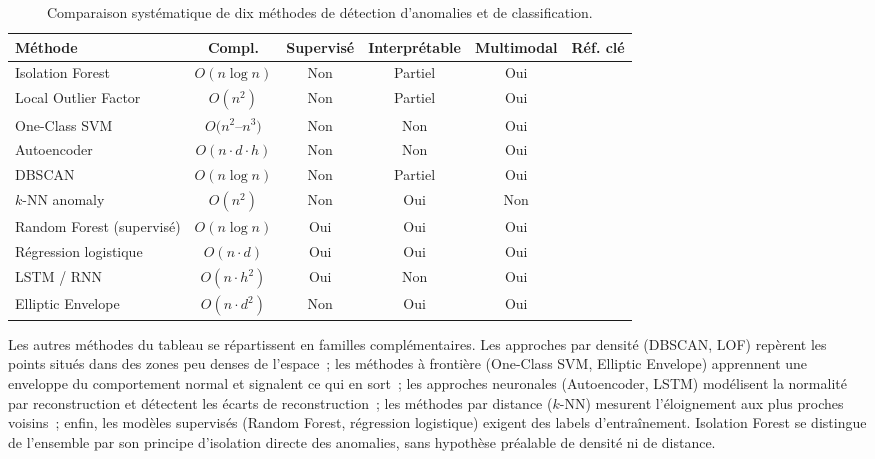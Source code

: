 \begin{table}[H]
    \centering
    \small
    \setlength{\tabcolsep}{2.5pt}
    \caption{Comparaison systématique de dix méthodes de détection d'anomalies et de
    classification.}
    \label{tab:comparaison_methodes_anomalies}
     \begin{tabular}{lccccl}
        \toprule
        \textbf{Méthode} & \textbf{Compl.} & \textbf{Supervisé} &
        \textbf{Interprétable} & \textbf{Multimodal} &
        \textbf{Réf. clé} \\
        \midrule
        Isolation Forest
        & $O(n \log n)$ & Non & Partiel & Oui
        & \cite{liu2008isolation} \\
        \addlinespace
        Local Outlier Factor
        & $O(n^2)$ & Non & Partiel & Oui
        & \cite{breunig2000lof} \\
        \addlinespace
        One-Class SVM
        & $O(n^2$--$n^3)$ & Non & Non & Oui
        & \cite{scholkopf2001estimating} \\
        \addlinespace
        Autoencoder
        & $O(n \cdot d \cdot h)$ & Non & Non & Oui
        & \cite{sakurada2014anomaly} \\
        \addlinespace
        DBSCAN
        & $O(n \log n)$ & Non & Partiel & Oui
        & \cite{ester1996density} \\
        \addlinespace
        $k$-NN anomaly
        & $O(n^2)$ & Non & Oui & Non
        & \cite{ramaswamy2000efficient} \\
        \addlinespace
        Random Forest (supervisé)
        & $O(n \log n)$ & Oui & Oui & Oui
        & \cite{breiman2001} \\
        \addlinespace
        Régression logistique
        & $O(n \cdot d)$ & Oui & Oui & Oui
        & \cite{cox1958} \\
        \addlinespace
        LSTM / RNN
        & $O(n \cdot h^2)$ & Oui & Non & Oui
        & \cite{hochreiter1997} \\
        \addlinespace
        Elliptic Envelope
        & $O(n \cdot d^2)$ & Non & Oui & Oui
        & \cite{rousseeuw1999fast} \\
        \bottomrule
    \end{tabular}
\end{table}

Les autres méthodes du tableau se répartissent en familles complémentaires. Les approches
par densité (DBSCAN, LOF) repèrent les points situés dans des zones peu denses de l'espace~;
les méthodes à frontière (One-Class SVM, Elliptic Envelope) apprennent une enveloppe du
comportement normal et signalent ce qui en sort~; les approches neuronales (Autoencoder,
LSTM) modélisent la normalité par reconstruction et détectent les écarts de reconstruction~;
les méthodes par distance ($k$-NN) mesurent l'éloignement aux plus proches voisins~; enfin,
les modèles supervisés (Random Forest, régression logistique) exigent des labels
d'entraînement. Isolation Forest se distingue de l'ensemble par son principe d'isolation
directe des anomalies, sans hypothèse préalable de densité ni de distance.

